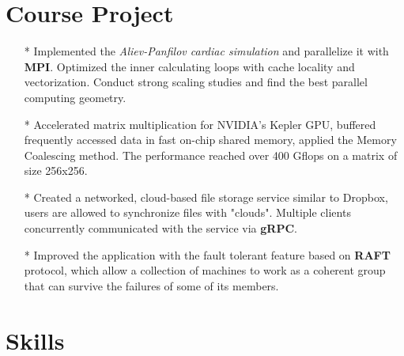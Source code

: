 \documentclass[10pt,letterpaper,sans]{moderncv} %
\begin{document}
\section{Course Project}

\begin{itemize}
    \item[*]{Implemented the \textit{Aliev-Panfilov cardiac simulation} and parallelize it with \textbf{MPI}. Optimized the inner calculating loops with cache locality and vectorization. Conduct strong scaling studies and find the best parallel computing geometry.}
    \item[*]{Accelerated matrix multiplication for NVIDIA's Kepler GPU, buffered frequently accessed data in fast on-chip shared memory, applied the Memory Coalescing method. The performance reached over 400 Gflops on a matrix of size 256x256.}
\end{itemize}

\begin{itemize}
    \item[*]{Created a networked, cloud-based file storage service similar to Dropbox, users are allowed to synchronize files with "clouds". Multiple clients concurrently communicated with the service via \textbf{gRPC}.}
    \item[*]{Improved the application with the fault tolerant feature based on \textbf{RAFT} protocol, which allow a collection of machines to work as a coherent group that can survive the failures of some of its members.}
\end{itemize}

\section{Skills}

\end{document}
